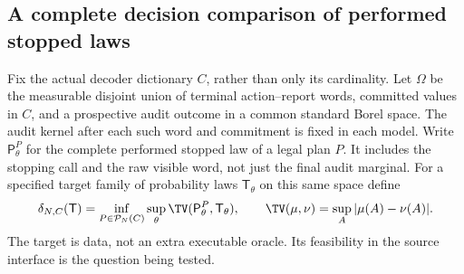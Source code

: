\subsection{A complete decision comparison of performed stopped laws}
Fix the actual decoder dictionary $C$, rather than only its cardinality. Let $\Omega$ be the measurable disjoint union of terminal action--report words, committed values in $C$, and a prospective audit outcome in a common standard Borel space. The audit kernel after each such word and commitment is fixed in each model. Write $\mathsf P_\theta^P$ for the complete performed stopped law of a legal plan $P$. It includes the stopping call and the raw visible word, not just the final audit marginal. For a specified target family of probability laws $\mathsf T_\theta$ on this same space define
\[
 \delta_{N,C}(\mathsf T)
 =\inf_{P\in\mathcal P_N(C)}\sup_\theta
                \TV(\mathsf P_\theta^P,\mathsf T_\theta),
 \qquad \TV(\mu,\nu)=\sup_A|\mu(A)-\nu(A)|.
\]
The target is data, not an extra executable oracle. Its feasibility in the source interface is the question being tested.

